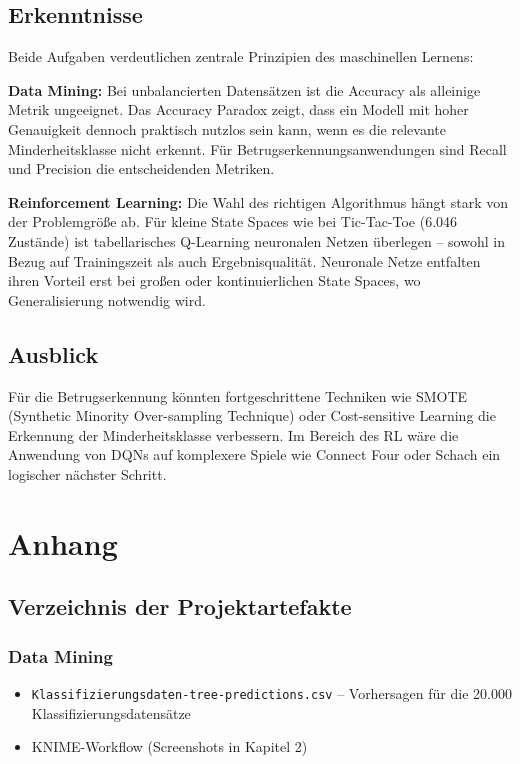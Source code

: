 \section{Erkenntnisse}

Beide Aufgaben verdeutlichen zentrale Prinzipien des maschinellen Lernens:

\textbf{Data Mining:} Bei unbalancierten Datensätzen ist die Accuracy als alleinige Metrik ungeeignet. Das Accuracy Paradox zeigt, dass ein Modell mit hoher Genauigkeit dennoch praktisch nutzlos sein kann, wenn es die relevante Minderheitsklasse nicht erkennt. Für Betrugserkennungsanwendungen sind Recall und Precision die entscheidenden Metriken.

\textbf{Reinforcement Learning:} Die Wahl des richtigen Algorithmus hängt stark von der Problemgröße ab. Für kleine State Spaces wie bei Tic-Tac-Toe (6.046 Zustände) ist tabellarisches Q-Learning neuronalen Netzen überlegen -- sowohl in Bezug auf Trainingszeit als auch Ergebnisqualität. Neuronale Netze entfalten ihren Vorteil erst bei großen oder kontinuierlichen State Spaces, wo Generalisierung notwendig wird.

\section{Ausblick}

Für die Betrugserkennung könnten fortgeschrittene Techniken wie SMOTE (Synthetic Minority Over-sampling Technique) oder Cost-sensitive Learning die Erkennung der Minderheitsklasse verbessern. Im Bereich des \ac{RL} wäre die Anwendung von \acp{DQN} auf komplexere Spiele wie Connect Four oder Schach ein logischer nächster Schritt.



\chapter{Anhang}

\section{Verzeichnis der Projektartefakte}

\subsection{Data Mining}
\begin{itemize}
    \item \texttt{Klassifizierungsdaten-tree-predictions.csv} -- Vorhersagen für die 20.000 Klassifizierungsdatensätze
    \item KNIME-Workflow (Screenshots in Kapitel 2)
\end{itemize}

